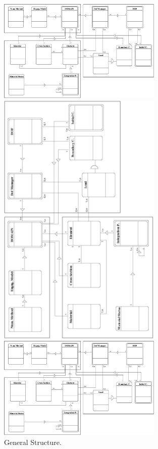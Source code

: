 \documentclass[a4paper]{article}
\begin{document}
\begin{figure}[tb]
\begin{htmlonly}
  \centerline{\includegraphics[width=0.7\textwidth]{general.eps}}
\end{htmlonly}
\ifpdf
\centerline{\includegraphics[angle=270,width=0.7\textwidth]{general.pdf}}
\else
\centerline{\includegraphics[width=0.7\textwidth]{general.eps}}
\fi
\caption{General Structure.}
\label{genstructfig}
\end{figure}
\end{document}
